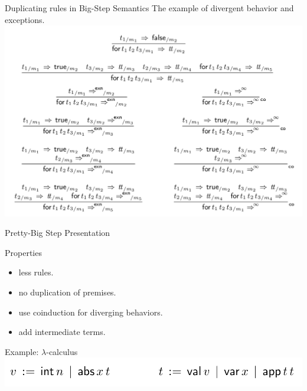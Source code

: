 \documentclass[page number,dvipsnames]{beamer}
\begin{document}
\begin{frame}{Duplicating rules in Big-Step Semantics}
  The example of divergent behavior and exceptions.\\
  \center
  \includegraphics[scale=0.25]{duplicates.png}
  
\end{frame}

\begin{frame}{Pretty-Big Step Presentation}
  \begin{exampleblock}{Properties}
    \begin{itemize}
    \item less rules.
    \item no duplication of premises.
    \item use coinduction for diverging behaviors.
    \item add intermediate terms.
    \end{itemize}
  \end{exampleblock}
  \vfill
  \begin{block}{Example: $\lambda$-calculus}
    \center
    \includegraphics[scale=0.3]{lambda.png}
  \end{block}
\end{frame}
\end{document}
